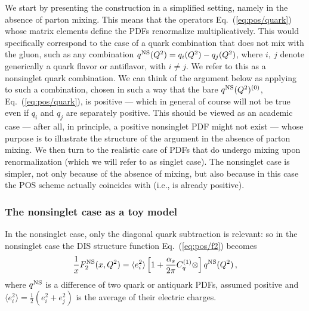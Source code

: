 We start by presenting the construction in a simplified setting, 
namely in the absence of parton mixing. This means that the operators
Eq.~(\ref{eq:pos/quark}) whose matrix elements define the PDFs renormalize
multiplicatively.
This would specifically correspond to
the case of a quark combination that does not mix with the
gluon, such as  any combination $q^{{\textrm{NS}}}(Q^2)=q_i(Q^2)-q_j(Q^2)$,
where $i,\>j$ denote generically a quark flavor or antiflavor, with
$i\not= j$.  We refer to this as a 
nonsinglet quark combination. We can think of the argument below as
applying to such a combination, 
chosen in such a way that  the bare
$q^{{\textrm{NS}}}(Q^2)^{(0)}$, Eq.~(\ref{eq:pos/quark}), is positive --- which in
general of course will not be true even if $q_i$ and $q_j$ are
separately positive. 
This should be viewed as an academic case --- after
all, in principle, a positive nonsinglet PDF might not exist --- whose
purpose is to illustrate the structure of the argument in the absence
of parton mixing. We then turn
to the realistic case of PDFs that do undergo mixing upon
renormalization (which we will refer to as singlet case).
The nonsinglet case is simpler, not only because of the absence of
mixing, but also because in  this case
the POS scheme actually coincides with \msbar{} (i.e., \msbar{} is already
positive). 

\subsubsection{The nonsinglet case as a toy model}
\label{sec:nonsing}

In the nonsinglet case, only the diagonal quark subtraction is relevant: so in
the nonsinglet case the DIS structure function Eq.~(\ref{eq:pos/f2}) becomes
\begin{equation}\label{eq:pos/disfact}
 \frac{1}{x} F_2^{{\textrm{NS}}}(x,Q^2)= \langle e_i^2\rangle \left[1
 +\frac{\alpha_s}{2\pi}  C^{(1)}_q \otimes \right] q^{{\textrm{NS}}}(Q^2) \,,
\end{equation}
where $q^{{\textrm{NS}}}$ is a difference of two quark or antiquark PDFs, assumed
positive and
$\langle
e^2_i\rangle=\frac{1}{2} \left(e^2_i+e^2_j\right)$ is the average of
their electric charges. 

